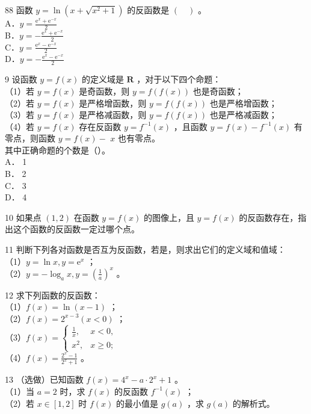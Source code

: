 \documentclass[10pt]{article}
\begin{document}
88 函数 \(y=\ln \left(x+\sqrt{x^{2}+1}\right)\) 的反函数是 \((\quad)\) 。\\
A．\(y=\frac{\mathrm{e}^{x}+\mathrm{e}^{-x}}{2}\)\\
B．\(y=-\frac{\mathrm{e}^{x}+\mathrm{e}^{-x}}{2}\)\\
C．\(y=\frac{\mathrm{e}^{x}-\mathrm{e}^{-x}}{2}\)\\
D．\(y=-\frac{\mathrm{e}^{x}-\mathrm{e}^{-x}}{2}\)

9 设函数 \(y=f(x)\) 的定义域是 \(\mathbf{R}\) ，对于以下四个命题：\\
（1）若 \(y=f(x)\) 是奇函数，则 \(y=f(f(x))\) 也是奇函数；\\
（2）若 \(y=f(x)\) 是严格增函数，则 \(y=f(f(x))\) 也是严格增函数；\\
（3）若 \(y=f(x)\) 是严格减函数，则 \(y=f(f(x))\) 也是严格减函数；\\
（4）若 \(y=f(x)\) 存在反函数 \(y=f^{-1}(x)\) ，且函数 \(y=f(x)-f^{-1}(x)\) 有零点，则函数 \(y=f(x)-\) \(x\) 也有零点。\\
其中正确命题的个数是（）。\\
A． 1\\
B． 2\\
C． 3\\
D． 4

10 如果点 \((1,2)\) 在函数 \(y=f(x)\) 的图像上，且 \(y=f(x)\) 的反函数存在，指出这个函数的反函数一定过哪个点。

11 判断下列各对函数是否互为反函数，若是，则求出它们的定义域和值域：\\
（1）\(y=\ln x, y=\mathrm{e}^{x}\) ；\\
（2）\(y=-\log _{a} x, y=\left(\frac{1}{a}\right)^{x}\) 。

12 求下列函数的反函数：\\
（1）\(f(x)=\ln (x-1)\) ；\\
（2）\(f(x)=2^{x-3}(x<0)\) ；\\
（3）\(f(x)= \begin{cases}\frac{1}{x}, & x<0, \\ x^{2}, & x \geqslant 0 ;\end{cases}\)\\
（4）\(f(x)=\frac{2^{x}-1}{2^{x}+1}\) 。

13 （选做）已知函数 \(f(x)=4^{x}-a \cdot 2^{x}+1\) 。\\
（1）当 \(a=2\) 时，求 \(f(x)\) 的反函数 \(f^{-1}(x)\) ；\\
（2）若 \(x \in[1,2]\) 时 \(f(x)\) 的最小值是 \(g(a)\) ，求 \(g(a)\) 的解析式。
\end{document}
